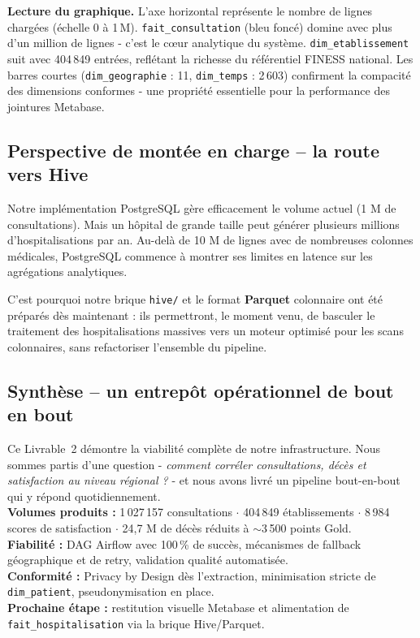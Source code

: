 \documentclass[12pt,a4paper]{report}
\begin{document}
\textbf{Lecture du graphique.} L'axe horizontal représente le nombre de lignes chargées (échelle 0 à 1\,M). \texttt{fait\_consultation} (bleu foncé) domine avec plus d'un million de lignes - c'est le c\oe ur analytique du système. \texttt{dim\_etablissement} suit avec 404\,849 entrées, reflétant la richesse du référentiel FINESS national. Les barres courtes (\texttt{dim\_geographie} : 11, \texttt{dim\_temps} : 2\,603) confirment la compacité des dimensions conformes - une propriété essentielle pour la performance des jointures Metabase.

\subsection{Perspective de montée en charge -- la route vers Hive}
Notre implémentation PostgreSQL gère efficacement le volume actuel (1 M de consultations). Mais un hôpital de grande taille peut générer plusieurs millions d'hospitalisations par an. Au-delà de 10 M de lignes avec de nombreuses colonnes médicales, PostgreSQL commence à montrer ses limites en latence sur les agrégations analytiques.

C'est pourquoi notre brique \texttt{hive/} et le format \textbf{Parquet} colonnaire ont été préparés dès maintenant : ils permettront, le moment venu, de basculer le traitement des hospitalisations massives vers un moteur optimisé pour les scans colonnaires, sans refactoriser l'ensemble du pipeline.

\subsection{Synthèse -- un entrepôt opérationnel de bout en bout}

\begin{successbox}
Ce Livrable~2 démontre la viabilité complète de notre infrastructure. Nous sommes partis d'une question - \textit{comment corréler consultations, décès et satisfaction au niveau régional ?} - et nous avons livré un pipeline bout-en-bout qui y répond quotidiennement.\\[6pt]
\textbf{Volumes produits :} 1\,027\,157 consultations $\cdot$ 404\,849 établissements $\cdot$ 8\,984 scores de satisfaction $\cdot$ 24,7 M de décès réduits à $\sim$3\,500 points Gold.\\[4pt]
\textbf{Fiabilité :} DAG Airflow avec 100\,\% de succès, mécanismes de fallback géographique et de retry, validation qualité automatisée.\\[4pt]
\textbf{Conformité :} Privacy by Design dès l'extraction, minimisation stricte de \texttt{dim\_patient}, pseudonymisation en place.\\[4pt]
\textbf{Prochaine étape :} restitution visuelle Metabase et alimentation de \texttt{fait\_hospitalisation} via la brique Hive/Parquet.
\end{successbox}
\end{document}
